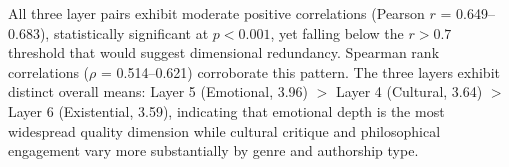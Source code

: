 All three layer pairs exhibit moderate positive correlations (Pearson $r$ = 0.649--0.683), statistically significant at $p<0.001$, yet falling below the $r>0.7$ threshold that would suggest dimensional redundancy. Spearman rank correlations ($\rho$ = 0.514--0.621) corroborate this pattern. The three layers exhibit distinct overall means: Layer 5 (Emotional, 3.96) $>$ Layer 4 (Cultural, 3.64) $>$ Layer 6 (Existential, 3.59), indicating that emotional depth is the most widespread quality dimension while cultural critique and philosophical engagement vary more substantially by genre and authorship type.
